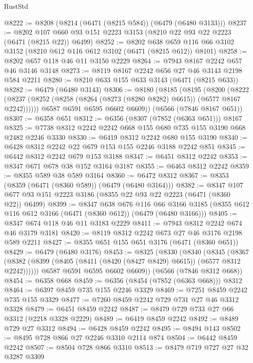 \begin{lexlean}{RustStd}
\begin{coremodule}
{\begin{coremodule}
{{{{{{{{{{{{{{{{{{{{{{{{{{@8222 := @8208 (@8214 (@6471 (@8215 @584)) (@6479 (@6480 @3133)))
@8237 := @8202 @107 @660 @93 @151 @2223 @3153 (@8210 @22 @93 @22 @2223 (@6471 (@8215 @22)) @6499)
@8252 := @8202
    @638
    @659
    @116
    @66
    @3102
    @3152
    (@8210 @612 @116 @612 @3102 (@6471 (@8215 @612)) @8101)
@8258 := @8202 @657 @118 @46 @11 @3150 @2229
@8264 := @7943 @8167 @2242 @657 @46 @3146 @3148
@8273 := @8119 @8167 @2242 @656 @27 @46 @3143 @2198 @584 @2211
@8280 := @8210 @633 @155 @633 @3143 (@6471 (@8215 @633))
@8282 := @6479 (@6480 @3143)
@8306 := @8180
    (@8185
      (@8195
        (@8200
          (@8222 (@8237 (@8252 (@8258 (@8264 (@8273 (@8280 @8282) @6615)) (@6577 @8167 @2242))))))
        @6587
        @6591
        @6595
        @6602
        @6609))
    (@6566 (@7846 @8167 @651))
@8307 := @6358 @651
@8312 := @6356 (@8307 (@7852 (@6363 @651))) @8167
@8325 := @7738 @8312 @2242 @2242 @668 @155 @680 @735 @155 @3190 @668 @2482 @2246 @3330
@8330 := @6419 @8312 @2242 @680 @155 @3190
@8340 := @6428 @8312 @2242 @22 @679 @153 @155 @2246 @3188 @2242 @851
@8345 := @6442 @8312 @2242 @679 @153 @3188
@8347 := @6451 @8312 @2242
@8353 := @8347 @671 @678 @38 @152 @3164 @3187
@8355 := @6463 @8312 @2242
@8359 := @8355 @589 @38 @589 @3164
@8360 := @6472 @8312
@8367 := @8353 (@8359 (@6471 (@8360 @589)) (@6479 (@6480 @3164)))
@8382 := @8347 @107 @677 @93 @151 @2223 @3186 (@8355 @22 @93 @22 @2223 (@6471 (@8360 @22)) @6499)
@8399 := @8347
    @638
    @676
    @116
    @66
    @3166
    @3185
    (@8355 @612 @116 @612 @3166 (@6471 (@8360 @612)) (@6479 (@6480 @3166)))
@8405 := @8347 @674 @118 @46 @11 @3183 @2229
@8411 := @7943 @8312 @2242 @674 @46 @3179 @3181
@8420 := @8119 @8312 @2242 @673 @27 @46 @3176 @2198 @589 @2211
@8427 := @8355 @651 @155 @651 @3176 (@6471 (@8360 @651))
@8429 := @6479 (@6480 @3176)
@8453 := @8325
    (@8330
      (@8340
        (@8345
          (@8367 (@8382 (@8399 (@8405 (@8411 (@8420 (@8427 @8429) @6615)) (@6577 @8312 @2242))))))
        @6587
        @6591
        @6595
        @6602
        @6609))
    (@6566 (@7846 @8312 @668))
@8454 := @6358 @668
@8459 := @6356 (@8454 (@7852 (@6363 @668))) @8312
@8464 := @6397 @8459 @735 @155 @2246 @3329
@8469 := @7251 @8459 @2242 @735 @155 @3329
@8477 := @7260 @8459 @2242 @729 @731 @27 @46 @3312 @3328
@8479 := @6451 @8459 @2242
@8487 := @8479 @729 @733 @27 @66 @3312 (@2218 @3328 @2229)
@8489 := @6419 @8459 @2242
@8492 := @8489 @729 @27 @3312
@8494 := @6428 @8459 @2242
@8495 := @8494 @143
@8502 := @8495 @728 @866 @27 @2246 @3310 @2114 @874
@8504 := @6442 @8459 @2242
@8507 := @8504 @728 @866 @3310
@8513 := @8479 @719 @727 @27 @32 @3287 @3309
}}}}}}}}}}}}}}}}}}}}}}}}}}
\end{coremodule}}
\end{coremodule}
\end{lexlean}
